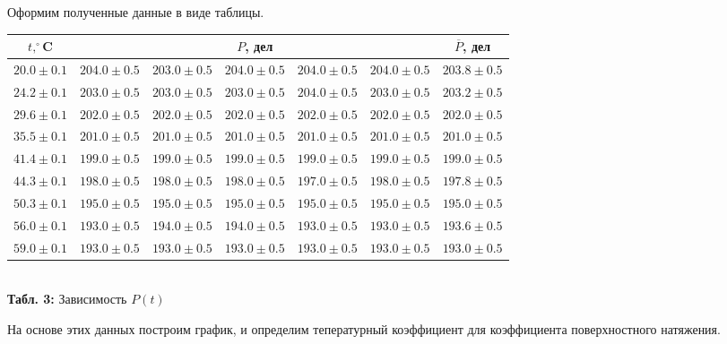\documentclass[12pt,a4paper]{scrartcl}
\begin{document}
	Оформим полученные данные в виде таблицы.
	
	\begin{center}
		\begin{tabular}{|c|c|c|c|c|c|c|}
			\hline
			$t, ^\circ$C & \multicolumn{5}{|c|}{$P$, дел} & $\overline{P}$, дел
			\\\hline
			$20.0 \pm 0.1$ & $204.0 \pm 0.5$ & $203.0 \pm 0.5$ & $204.0 \pm 0.5$ & $204.0 \pm 0.5$ & $204.0 \pm 0.5$ & $203.8 \pm 0.5$
			\\\hline
			$24.2 \pm 0.1$ & $203.0 \pm 0.5$ & $203.0 \pm 0.5$ & $203.0 \pm 0.5$ & $204.0 \pm 0.5$ & $203.0 \pm 0.5$ & $203.2 \pm 0.5$
			\\\hline
			$29.6 \pm 0.1$ & $202.0 \pm 0.5$ & $202.0 \pm 0.5$ & $202.0 \pm 0.5$ & $202.0 \pm 0.5$ & $202.0 \pm 0.5$ & $202.0 \pm 0.5$
			\\\hline
			$35.5 \pm 0.1$ & $201.0 \pm 0.5$ & $201.0 \pm 0.5$ & $201.0 \pm 0.5$ & $201.0 \pm 0.5$ & $201.0 \pm 0.5$ & $201.0 \pm 0.5$
			\\\hline
			$41.4 \pm 0.1$ & $199.0 \pm 0.5$ & $199.0 \pm 0.5$ & $199.0 \pm 0.5$ & $199.0 \pm 0.5$ & $199.0 \pm 0.5$ & $199.0 \pm 0.5$
			\\\hline
			$44.3 \pm 0.1$ & $198.0 \pm 0.5$ & $198.0 \pm 0.5$ & $198.0 \pm 0.5$ & $197.0 \pm 0.5$ & $198.0 \pm 0.5$ & $197.8 \pm 0.5$
			\\\hline
			$50.3 \pm 0.1$ & $195.0 \pm 0.5$ & $195.0 \pm 0.5$& $195.0 \pm 0.5$ & $195.0 \pm 0.5$ & $195.0 \pm 0.5$ & $195.0 \pm 0.5$
			\\\hline
			$56.0 \pm 0.1$ & $193.0 \pm 0.5$ & $194.0 \pm 0.5$ & $194.0 \pm 0.5$ & $193.0 \pm 0.5$ & $193.0 \pm 0.5$ & $193.6 \pm 0.5$
			\\\hline
			$59.0 \pm 0.1$ & $193.0 \pm 0.5$ & $193.0 \pm 0.5$ & $193.0 \pm 0.5$ & $193.0 \pm 0.5$ & $193.0 \pm 0.5$ & $193.0 \pm 0.5$
			\\\hline
		\end{tabular}
		\\\textbf{Табл. 3:} Зависимость $P(t)$
	\end{center}
	
	На основе этих данных построим график, и определим тепературный коэффициент для коэффициента поверхностного натяжения.
	
\end{document}

